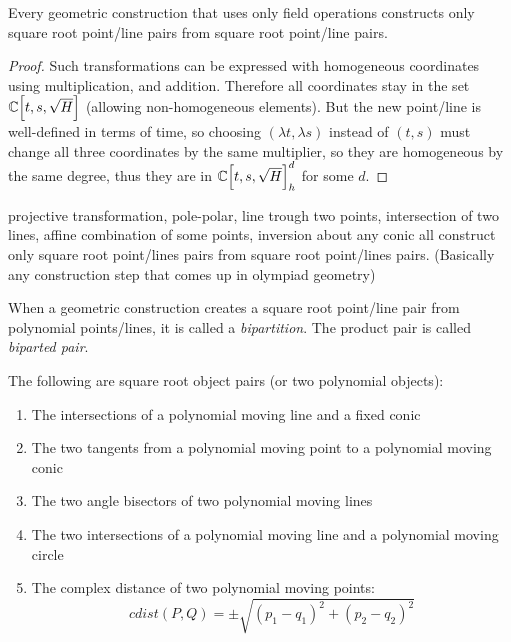 \documentclass[a4paper]{article}
\begin{document}
\begin{lemma}
    Every geometric construction that uses only field operations constructs only square root point/line pairs from square root point/line pairs.
\end{lemma}
\begin{proof}
    Such transformations can be expressed with homogeneous coordinates using multiplication, and addition. Therefore all coordinates stay in the set $\mathbb{C}\Bigl[t,s,\sqrt{H}\Bigr]$ (allowing non-homogeneous elements). But the new point/line is well-defined in terms of time, so choosing $(\lambda t, \lambda s)$ instead of $(t,s)$ must change all three coordinates by the same multiplier, so they are homogeneous by the same degree, thus they are in $\mathbb{C}\Bigl[t,s,\sqrt{H}\Bigr]_h^d$ for some $d$.
\end{proof}

\begin{corollary}
    projective transformation, pole-polar, line trough two points, intersection of two lines, affine combination of some points, inversion about any conic all construct only square root point/lines pairs from square root point/lines pairs. (Basically any construction step that comes up in olympiad geometry)
\end{corollary}
\begin{definition}
    When a geometric construction creates a square root point/line pair from polynomial points/lines, it is called a \textit{bipartition}. The product pair is called \textit{biparted pair}.
\end{definition}
\begin{example}
    The following are square root object pairs (or two polynomial objects):
    \begin{enumerate}
        \item The intersections of a polynomial moving line and a fixed conic
        \item The two tangents from a polynomial moving point to a polynomial moving conic
        \item The two angle bisectors of two polynomial moving lines
        \item The two intersections of a polynomial moving line and a polynomial moving circle
        \item The complex distance of two polynomial moving points: $$cdist(P,Q)=\pm\sqrt{(p_1-q_1)^2+(p_2-q_2)^2}$$
    \end{enumerate}
\end{example}
\end{document}
